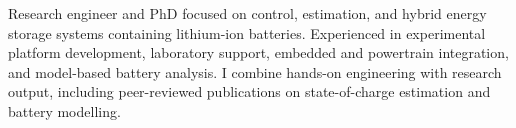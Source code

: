 
\begin{cvparagraph}

Research engineer and PhD focused on control, estimation, and hybrid energy storage systems containing lithium-ion batteries. Experienced in experimental platform development, laboratory support, embedded and powertrain integration, and model-based battery analysis. I combine hands-on engineering with research output, including peer-reviewed publications on state-of-charge estimation and battery modelling.

\end{cvparagraph}
